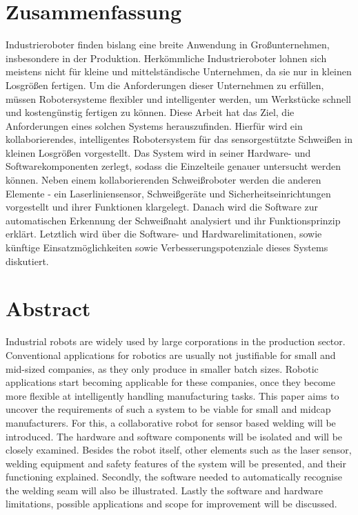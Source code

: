 \section*{\centering Zusammenfassung}
Industrieroboter finden bislang eine breite Anwendung in Großunternehmen, insbesondere in der Produktion. Herkömmliche Industrieroboter lohnen sich meistens nicht für kleine und mittelständische Unternehmen, da sie nur in kleinen Losgrößen fertigen. Um die Anforderungen dieser Unternehmen zu erfüllen, müssen Robotersysteme flexibler und intelligenter werden, um Werkstücke schnell und kostengünstig fertigen zu können. Diese Arbeit hat das Ziel, die Anforderungen eines solchen Systems herauszufinden. Hierfür wird ein kollaborierendes, intelligentes Robotersystem für das sensorgestützte Schweißen in kleinen Losgrößen vorgestellt. Das System wird in seiner Hardware- und Softwarekomponenten zerlegt, sodass die Einzelteile genauer untersucht werden können. Neben einem kollaborierenden Schweißroboter werden die anderen Elemente - ein Laserliniensensor, Schweißgeräte und Sicherheitseinrichtungen vorgestellt und ihrer Funktionen klargelegt. Danach wird die Software zur automatischen Erkennung der Schweißnaht analysiert und ihr Funktionsprinzip erklärt. Letztlich wird über die Software- und Hardwarelimitationen, sowie künftige Einsatzmöglichkeiten sowie Verbesserungspotenziale dieses Systems diskutiert.

\section*{\centering Abstract}
Industrial robots are widely used by large corporations in the production sector. Conventional applications for robotics are usually not justifiable for small and mid-sized companies, as they only produce in smaller batch sizes. Robotic applications start becoming applicable for these companies, once they become more flexible at intelligently handling manufacturing tasks. This paper aims to uncover the requirements of such a system to be viable for small and midcap manufacturers. For this, a collaborative robot for sensor based welding will be introduced. The hardware and software components will be isolated and will be closely examined. Besides the robot itself, other elements such as the laser sensor, welding equipment and safety features of the system will be presented, and their functioning explained. Secondly, the software needed to automatically recognise the welding seam will also be illustrated. Lastly the software and hardware limitations, possible applications and scope for improvement will be discussed.
